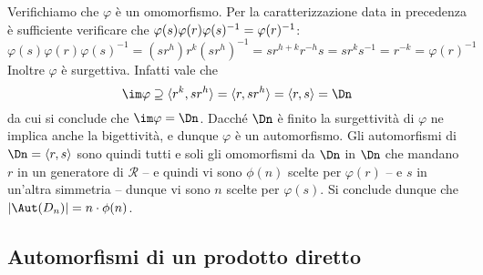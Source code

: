 \documentclass[11pt]{scrartcl}
\begin{document}
	
	Verifichiamo che $\varphi$ è un omomorfismo. Per la 
	caratterizzazione data in precedenza è sufficiente verificare che
	$\varphi(s)\varphi(r)\varphi(s)^{-1} = \nolinebreak\varphi(r)^{-1}$:
	\[
	\varphi(s)\varphi(r)\varphi(s)^{-1} = (sr^h)r^k(sr^h)^{-1} = sr^{h + k}r^{-h}s =
	sr^k s^{-1} = r^{-k} = \varphi(r)^{-1}
	\]
	Inoltre $\varphi$ è surgettiva. Infatti vale che
	\[
	\im \varphi \supseteq \langle r^k, sr^h \rangle = \langle r, sr^h \rangle = \langle r, s \rangle =
	\Dn
	\]
	da cui si conclude che $\im \varphi = \Dn$. Dacché $\Dn$ è finito la surgettività di $\varphi$ ne implica anche la bigettività, e dunque $\varphi$
	è un automorfismo. Gli automorfismi di $\Dn = \langle r, s\rangle$ sono quindi
	tutti e soli gli omomorfismi da $\Dn$ in $\Dn$ che mandano $r$ in un generatore
	di $\mathcal{R}$ -- e quindi vi sono $\phi(n)$ scelte per $\varphi(r)$ -- e $s$ in un'altra simmetria -- dunque vi sono $n$ scelte per $\varphi(s)$. Si conclude dunque che
	$\lvert \Aut(D_n) \rvert = n \cdot \phi(n)$.
	
	\newpage
	
	\subsection{Automorfismi di un prodotto diretto}
	
\end{document}
